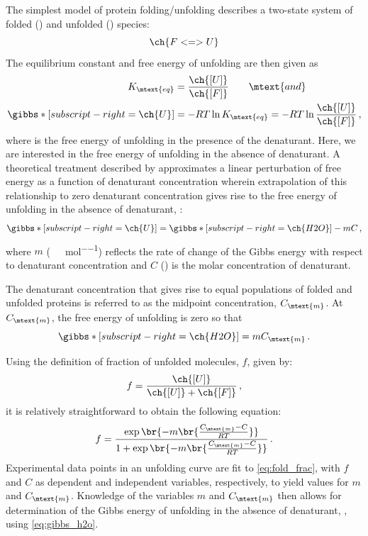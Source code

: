 The simplest model of protein folding/unfolding describes a two-state system of folded () and unfolded () species:
\begin{equation}
  \ch{F <=> U} 
\end{equation}
The equilibrium constant and free energy of unfolding are then given as 
\begin{align}
	K_\mtext{eq} &= \frac{\ch{[U]}}{\ch{[F]}} \qquad \mtext{and} \\
	{}\gibbs*[subscript-right=\ch{U}]{} &= -RT \ln{K_\mtext{eq}} = -RT \ln{\frac{\ch{[U]}}{\ch{[F]}}} \, ,
\end{align}
where \gibbs*[subscript-right=\ch{U}]{} is the free energy of unfolding in the presence of the denaturant. 
Here, we are interested in the free energy of unfolding in the absence of denaturant. 
A theoretical treatment described by \textcite{pace86,jones97} approximates a linear perturbation of free energy as a function of denaturant concentration wherein extrapolation of this relationship to zero denaturant concentration gives rise to the free energy of unfolding in the absence of denaturant, \gibbs*[subscript-right=\ch{H2O}]{}:
\begin{equation}
	\gibbs*[subscript-right=\ch{U}]{} = \gibbs*[subscript-right=\ch{H2O}]{} - m C \, ,
\end{equation}
where \( m \) (\unit{\kilo\cal\per\Molar\per\mole}) reflects the rate of change of the Gibbs energy with respect to denaturant concentration and \( C \) (\unit{\Molar}) is the molar concentration of denaturant. 

The denaturant concentration that gives rise to equal populations of folded and unfolded proteins is referred to as the midpoint concentration, \( C_\mtext{m} \).  At \( C_\mtext{m} \), the free energy of unfolding is zero so that
\begin{equation}
	\gibbs*[subscript-right=\ch{H2O}]{} = m C_\mtext{m} \, .
	\label{eq:gibbs_h2o}
\end{equation}

Using the definition of fraction of unfolded molecules, \( f \), given by:
\begin{equation}
	f = \frac{\ch{[U]}}{\ch{[U]} + \ch{[F]}} \, ,
	\label{eq:conc_frac}
\end{equation}
it is relatively straightforward to obtain the following equation:
\begin{equation}
	f = \frac{ \exp\br{ -m \br{\frac{C_\mtext{m} - C}{RT}}}}{1 + \exp\br{-m \br{\frac{C_\mtext{m} - C}{RT}}}} \, .
	\label{eq:fold_frac}
\end{equation}
Experimental data points in an unfolding curve are fit to \cref{eq:fold_frac}, with \( f \) and \( C \) as dependent and independent variables, respectively, to yield values for \( m \) and \( C_\mtext{m} \). 
Knowledge of the variables \( m \) and \( C_\mtext{m} \) then allows for determination of the Gibbs energy of unfolding in the absence of denaturant, \gibbs*[subscript-right=\ch{H2O}], using \cref{eq:gibbs_h2o}.

